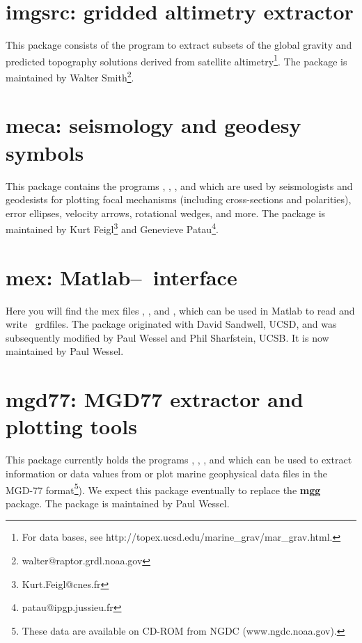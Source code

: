\section{imgsrc: gridded altimetry extractor}

This package consists of the program  to
extract subsets of the global gravity and predicted topography
solutions derived from satellite altimetry\footnote{For data bases,
see http://topex.ucsd.edu/marine\_grav/mar\_grav.html.}.  The package
is maintained by Walter Smith\footnote{walter@raptor.grdl.noaa.gov}.

\section{meca: seismology and geodesy symbols}

This package contains the programs , ,
, and  which are used
by seismologists and geodesists for plotting focal mechanisms (including
cross-sections and polarities), error ellipses, velocity arrows, rotational
wedges, and more.  The package is maintained by
Kurt Feigl\footnote{Kurt.Feigl@cnes.fr} and
Genevieve Patau\footnote{patau@ipgp.jussieu.fr}.

\section{mex: Matlab--\gmt\ interface}

Here you will find the mex files , ,
and , which can be used in Matlab to read and write
\GMT\ grdfiles.  The package originated with David Sandwell, UCSD,
and was subsequently modified by Paul Wessel and Phil Sharfstein, UCSB.
It is now maintained by Paul Wessel.

\section{mgd77: MGD77 extractor and plotting tools}

This package currently holds the programs , ,
, and  which can be
used to extract information or data values from or plot marine geophysical
data files in the MGD-77 format\footnote{These data are available on CD-ROM from NGDC
(www.ngdc.noaa.gov).}).  We expect this package eventually to replace the {\bf mgg} package.
The package is maintained by Paul Wessel.

